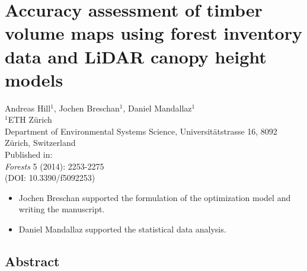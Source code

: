 \chapter{Accuracy assessment of timber volume maps using forest inventory data and LiDAR canopy height models}
\label{chap:mapp}
{\large Andreas Hill$^1$, Jochen Breschan$^1$, Daniel Mandallaz$^1$}\\

\vspace{3cm}
\noindent
$^1$ETH Z\"urich\\Department of Environmental Systems Science, Universit\"atstrasse 16, 8092 Z\"urich, Switzerland \\

\vspace{\fill}
\noindent
Published in:\\
\textit{Forests} 5 (2014): 2253-2275\\
(DOI: 10.3390/f5092253)

\newpage
\thispagestyle{plain}
\renewcommand{\labelitemi}{--}
\begin{itemize}
	\item Jochen Breschan supported the formulation of the optimization model and writing the manuscript.
	\item Daniel Mandallaz supported the statistical data analysis.
\end{itemize}

\clearpage

\clearpage
\section*{Abstract}
\label{chap:regmod:Abstract}

